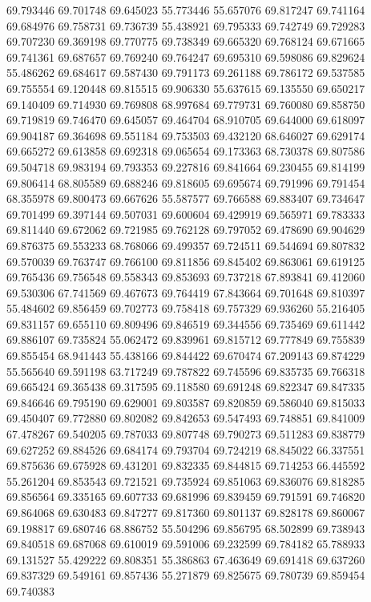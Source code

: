 69.793446
69.701748
69.645023
55.773446
55.657076
69.817247
69.741164
69.684976
69.758731
69.736739
55.438921
69.795333
69.742749
69.729283
69.707230
69.369198
69.770775
69.738349
69.665320
69.768124
69.671665
69.741361
69.687657
69.769240
69.764247
69.695310
69.598086
69.829624
55.486262
69.684617
69.587430
69.791173
69.261188
69.786172
69.537585
69.755554
69.120448
69.815515
69.906330
55.637615
69.135550
69.650217
69.140409
69.714930
69.769808
68.997684
69.779731
69.760080
69.858750
69.719819
69.746470
69.645057
69.464704
68.910705
69.644000
69.618097
69.904187
69.364698
69.551184
69.753503
69.432120
68.646027
69.629174
69.665272
69.613858
69.692318
69.065654
69.173363
68.730378
69.807586
69.504718
69.983194
69.793353
69.227816
69.841664
69.230455
69.814199
69.806414
68.805589
69.688246
69.818605
69.695674
69.791996
69.791454
68.355978
69.800473
69.667626
55.587577
69.766588
69.883407
69.734647
69.701499
69.397144
69.507031
69.600604
69.429919
69.565971
69.783333
69.811440
69.672062
69.721985
69.762128
69.797052
69.478690
69.904629
69.876375
69.553233
68.768066
69.499357
69.724511
69.544694
69.807832
69.570039
69.763747
69.766100
69.811856
69.845402
69.863061
69.619125
69.765436
69.756548
69.558343
69.853693
69.737218
67.893841
69.412060
69.530306
67.741569
69.467673
69.764419
67.843664
69.701648
69.810397
55.484602
69.856459
69.702773
69.758418
69.757329
69.936260
55.216405
69.831157
69.655110
69.809496
69.846519
69.344556
69.735469
69.611442
69.886107
69.735824
55.062472
69.839961
69.815712
69.777849
69.755839
69.855454
68.941443
55.438166
69.844422
69.670474
67.209143
69.874229
55.565640
69.591198
63.717249
69.787822
69.745596
69.835735
69.766318
69.665424
69.365438
69.317595
69.118580
69.691248
69.822347
69.847335
69.846646
69.795190
69.629001
69.803587
69.820859
69.586040
69.815033
69.450407
69.772880
69.802082
69.842653
69.547493
69.748851
69.841009
67.478267
69.540205
69.787033
69.807748
69.790273
69.511283
69.838779
69.627252
69.884526
69.684174
69.793704
69.724219
68.845022
66.337551
69.875636
69.675928
69.431201
69.832335
69.844815
69.714253
66.445592
55.261204
69.853543
69.721521
69.735924
69.851063
69.836076
69.818285
69.856564
69.335165
69.607733
69.681996
69.839459
69.791591
69.746820
69.864068
69.630483
69.847277
69.817360
69.801137
69.828178
69.860067
69.198817
69.680746
68.886752
55.504296
69.856795
68.502899
69.738943
69.840518
69.687068
69.610019
69.591006
69.232599
69.784182
65.788933
69.131527
55.429222
69.808351
55.386863
67.463649
69.691418
69.637260
69.837329
69.549161
69.857436
55.271879
69.825675
69.780739
69.859454
69.740383
